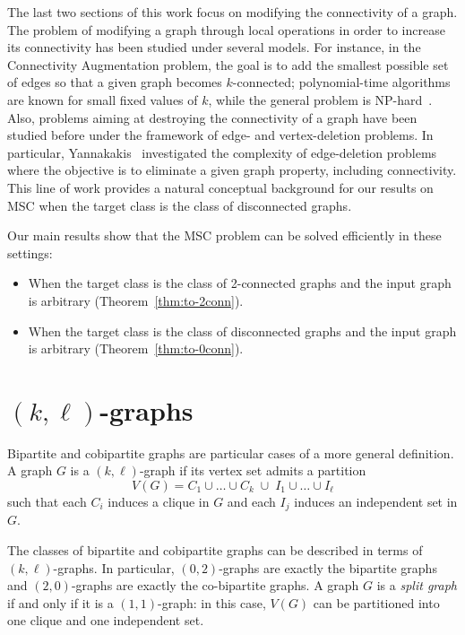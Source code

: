 \documentclass[11pt]{article}
\theoremstyle{definition}
\begin{document}
The last two sections of this work focus on modifying the connectivity of a graph.  
The problem of modifying a graph through local operations in order to increase its connectivity has been studied under several models.  
For instance, in the Connectivity Augmentation problem, the goal is to add the smallest possible set of edges so that a given graph becomes $k$-connected; polynomial-time algorithms are known for small fixed values of $k$, while the general problem is NP-hard~\cite{EswaranTarjan1976,WatanabeNakamura1987,ByrkaGrandoniAmeli2019}.  
Also, 
problems aiming at destroying the connectivity of a graph have been studied before under the framework of edge- and vertex-deletion problems.
In particular, Yannakakis~\cite{Yannakakis1981} investigated the complexity of edge-deletion problems where the objective is to eliminate a given graph property, including connectivity.
This line of work provides a natural conceptual background for our results on MSC when the target class is the class of disconnected graphs.


Our main results show that the MSC problem can be solved efficiently in these settings:
\begin{itemize}
    \item When the target class is the class of 2-connected graphs and the input graph is arbitrary (Theorem~\ref{thm:to-2conn}).
    \item When the target class is the class of disconnected graphs and the input graph is arbitrary (Theorem~\ref{thm:to-0conn}).
\end{itemize}

\section{$(k,\ell)$-graphs}\label{section:kl}

Bipartite and cobipartite graphs are particular cases of a more general definition.
A graph $G$ is a \((k,\ell)\)-graph if its vertex set admits a partition
\[
V(G) = C_1 \cup \dots \cup C_k \;\cup\; I_1 \cup \dots \cup I_\ell
\]
such that each $C_i$ induces a clique in $G$ and each $I_j$ induces an 
independent set in $G$.


The classes of bipartite and cobipartite graphs can be described in terms of 
$(k,\ell)$-graphs. In particular, $(0,2)$-graphs are exactly the bipartite graphs 
and $(2,0)$-graphs are exactly the co-bipartite graphs. A graph $G$ is a 
\emph{split graph} if and only if it is a $(1,1)$-graph: in this case, $V(G)$ can 
be partitioned into one clique and one independent set.
\end{document}

